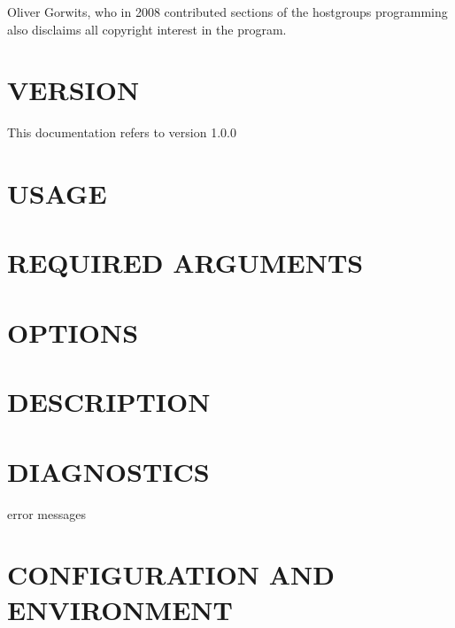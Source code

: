 \documentclass{book}
\begin{document}
Oliver Gorwits, who in 2008 contributed sections of the hostgroups programming also disclaims all copyright interest in the program.




\section{VERSION}
\label{_VERSION}
\hypertarget{_VERSION}{}



This documentation refers to version 1.0.0


\section{USAGE}
\label{_USAGE}
\hypertarget{_USAGE}{}


\section{REQUIRED ARGUMENTS}
\label{_REQUIRED_ARGUMENTS}
\hypertarget{_REQUIRED_ARGUMENTS}{}


\section{OPTIONS}
\label{_OPTIONS}
\hypertarget{_OPTIONS}{}


\section{DESCRIPTION}
\label{_DESCRIPTION}
\hypertarget{_DESCRIPTION}{}


\section{DIAGNOSTICS}
\label{_DIAGNOSTICS}
\hypertarget{_DIAGNOSTICS}{}



error messages


\section{CONFIGURATION AND ENVIRONMENT}
\label{_CONFIGURATION_AND_ENVIRONMENT}
\hypertarget{_CONFIGURATION_AND_ENVIRONMENT}{}
\end{document}
